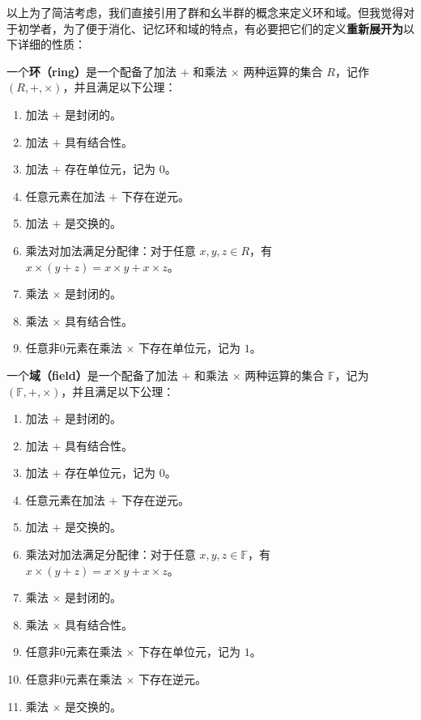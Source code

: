 以上为了简洁考虑，我们直接引用了群和幺半群的概念来定义环和域。但我觉得对于初学者，为了便于消化、记忆环和域的特点，有必要把它们的定义\textbf{重新展开为}以下详细的性质：

\begin{definition}{}
一个\textbf{环（ring）}是一个配备了加法 $+$ 和乘法 $\times$ 两种运算的集合 $R$，记作 $(R, +, \times)$，并且满足以下公理：
\begin{enumerate}
    \item 加法 $+$ 是封闭的。
    \item 加法 $+$ 具有结合性。
    \item 加法 $+$ 存在单位元，记为 $0$。
    \item 任意元素在加法 $+$ 下存在逆元。
    \item 加法 $+$ 是交换的。
    \item 乘法对加法满足分配律：对于任意 $x, y, z\in R$，有 $x\times(y+z)=x\times y+x\times z$。
    \item 乘法 $\times$ 是封闭的。
    \item 乘法 $\times$ 具有结合性。
    \item 任意非$0$元素在乘法 $\times$ 下存在单位元，记为 $1$。
\end{enumerate}
\end{definition}

\begin{definition}{}
一个\textbf{域（field）}是一个配备了加法 $+$ 和乘法 $\times$ 两种运算的集合 $\mathbb{F}$，记为 $(\mathbb{F}, +, \times)$，并且满足以下公理：

\begin{enumerate}
    \item 加法 $+$ 是封闭的。
    \item 加法 $+$ 具有结合性。
    \item 加法 $+$ 存在单位元，记为 $0$。
    \item 任意元素在加法 $+$ 下存在逆元。
    \item 加法 $+$ 是交换的。
    \item 乘法对加法满足分配律：对于任意 $x, y, z\in \mathbb{F}$，有 $x\times(y+z)=x\times y+x\times z$。
    \item 乘法 $\times$ 是封闭的。
    \item 乘法 $\times$ 具有结合性。
    \item 任意非$0$元素在乘法 $\times$ 下存在单位元，记为 $1$。
    \item 任意非$0$元素在乘法 $\times$ 下存在逆元。
    \item 乘法 $\times$ 是交换的。
\end{enumerate}
\end{definition}

